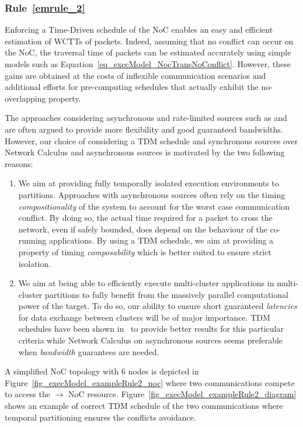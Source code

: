 \documentclass[main.tex]{subfiles}
\begin{document}
\subsubsection{Rule~\ref{emrule_2}}
Enforcing a Time-Driven schedule of the NoC enables an easy and efficient estimation of WCTTs of packets. Indeed, assuming that no conflict can occur on the NoC, the traversal time of packets can be estimated accurately using simple models such as Equation~\ref{eq_execModel_NocTransNoConflict}. However, these gains are obtained at the costs of inflexible communication scenarios and additional efforts for pre-computing schedules that actually exhibit the no-overlapping property.

The approaches considering asynchronous and rate-limited sources such as \cite{Dinechin2014} and \cite{Giannopoulou2015} are often argued to provide more flexibility and good guaranteed bandwidths. However, our choice of considering a TDM schedule and synchronous sources over Network Calculus and asynchronous sources is motivated by the two following reasons:

\begin{enumerate}
    \item We aim at providing fully temporally isolated execution environments to partitions. Approaches with asynchronous sources often rely on the timing \emph{compositionality} of the system to account for the worst case communication conflict. By doing so, the actual time required for a packet to cross the network, even if safely bounded, does depend on the behaviour of the co-running applications. By using a TDM schedule, we aim at providing a property of timing \emph{composability} which is better suited to ensure strict isolation.
    \item We aim at being able to efficiently execute multi-cluster applications in multi-cluster partitions to fully benefit from the massively parallel computational power of the target. To do so, our ability to ensure short guaranteed \emph{latencies} for data exchange between clusters will be of major importance. TDM schedules have been shown in~\cite{Puffitsch2015} to provide better results for this particular criteria while Network Calculus on asynchronous sources seems preferable when \emph{bandwidth} guarantees are needed.
\end{enumerate}

\begin{example}
    A simplified NoC topology with 6 nodes is depicted in Figure~\ref{fig_execModel_exampleRule2_noc} where two communications compete to access the  $\to$  NoC resource. Figure~\ref{fig_execModel_exampleRule2_diagram} shows an example of correct TDM schedule of the two communications where temporal partitioning ensures the conflicts avoidance.
\end{example}
\end{document}
